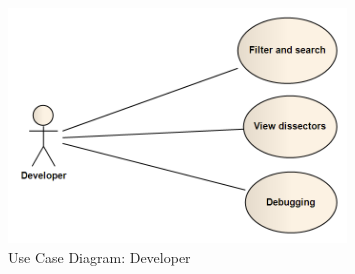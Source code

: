 \begin{figure}[htbp]
	\center
	\includegraphics[width=0.8\textwidth]{./planning/img/developer}
	\caption{Use Case Diagram: Developer\label{fig:req:ucdev}}
\end{figure}


